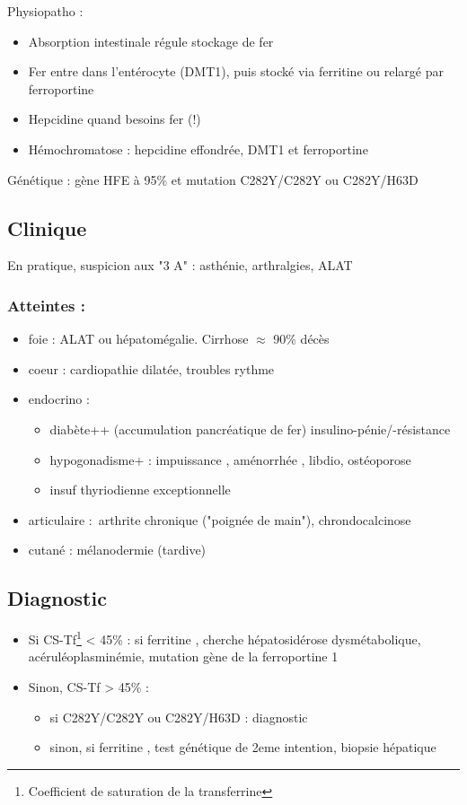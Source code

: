 \documentclass[11pt]{article}
\begin{document}
Physiopatho : 
\begin{itemize}
\item Absorption intestinale régule stockage de fer
\item Fer entre dans l'entérocyte (DMT1), puis stocké via ferritine ou relargé par ferroportine
\item Hepcidine \dec quand besoins fer \inc (!)
\item Hémochromatose : hepcidine effondrée, DMT1 et ferroportine \inc
\end{itemize}

Génétique : gène HFE à 95\% et mutation C282Y/C282Y ou C282Y/H63D

\subsection{Clinique}
\label{sec:org6b43e5f}
En pratique, suspicion aux "3 A" : asthénie, arthralgies, \inc ALAT

\subsubsection{Atteintes :}
\label{sec:org4a755ae}
\begin{itemize}
\item foie : \inc ALAT ou hépatomégalie. Cirrhose \(\approx\) 90\% décès
\item coeur : cardiopathie dilatée, troubles rythme
\item endocrino :
\begin{itemize}
\item diabète++ (accumulation pancréatique de fer) insulino-pénie/-résistance
\item hypogonadisme+ : impuissance \male, aménorrhée \female, \dec libdio,
ostéoporose
\item insuf thyriodienne exceptionnelle
\end{itemize}
\item articulaire : arthrite chronique ("poignée de main"), chrondocalcinose
\item cutané : mélanodermie (tardive)
\end{itemize}


\subsection{Diagnostic}
\label{sec:orgaf1827a}
\begin{itemize}
\item Si CS-Tf\footnote{Coefficient de saturation de la transferrine} < 45\% : si ferritine \inc, cherche hépatosidérose dysmétabolique,
acéruléoplasminémie, mutation gène de la ferroportine 1
\item Sinon, CS-Tf > 45\% : 
\begin{itemize}
\item si C282Y/C282Y ou C282Y/H63D : diagnostic
\item sinon, si ferritine \inc, test génétique de 2eme intention, biopsie
hépatique
\end{itemize}
\end{itemize}
\end{document}
